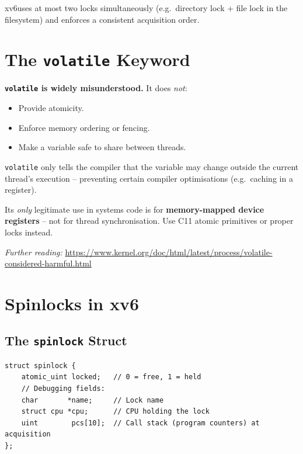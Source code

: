 \documentclass[11pt,a4paper]{article}
\newcommand{\xv}{xv6}
\begin{document}
\xv uses at most two locks simultaneously (e.g.\ directory lock + file lock
in the filesystem) and enforces a consistent acquisition order.

\section{The \texttt{volatile} Keyword}

\begin{warnbox}
\textbf{\texttt{volatile} is widely misunderstood.}  It does \emph{not}:
\begin{itemize}
  \item Provide atomicity.
  \item Enforce memory ordering or fencing.
  \item Make a variable safe to share between threads.
\end{itemize}

\texttt{volatile} only tells the compiler that the variable may change
outside the current thread's execution -- preventing certain compiler
optimisations (e.g.\ caching in a register).

Its \emph{only} legitimate use in systems code is for \textbf{memory-mapped
device registers} -- not for thread synchronisation.  Use C11 atomic
primitives or proper locks instead.

\textit{Further reading:} \url{https://www.kernel.org/doc/html/latest/process/volatile-considered-harmful.html}
\end{warnbox}

\section{Spinlocks in xv6}

\subsection{The \texttt{spinlock} Struct}

\begin{lstlisting}
struct spinlock {
    atomic_uint locked;   // 0 = free, 1 = held
    // Debugging fields:
    char       *name;     // Lock name
    struct cpu *cpu;      // CPU holding the lock
    uint        pcs[10];  // Call stack (program counters) at acquisition
};
\end{lstlisting}
\end{document}
